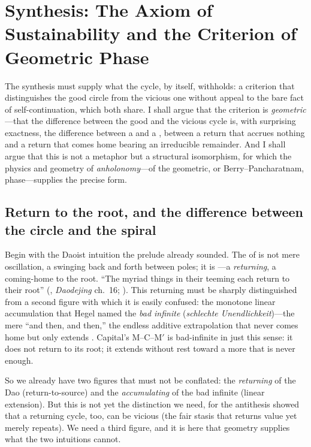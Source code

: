 \section{Synthesis: The Axiom of Sustainability and the Criterion of Geometric Phase}
\label{p09:sec:synthesis}

\noindent
The synthesis must supply what the cycle, by itself, withholds: a criterion that distinguishes the good circle from the vicious one without appeal to the bare fact of self-continuation, which both share. I shall argue that the criterion is \emph{geometric}---that the difference between the good and the vicious cycle is, with surprising exactness, the difference between a  and a , between a return that accrues nothing and a return that comes home bearing an irreducible remainder. And I shall argue that this is not a metaphor but a structural isomorphism, for which the physics and geometry of \emph{anholonomy}---of the geometric, or Berry--Pancharatnam, phase---supplies the precise form.

\subsection{Return to the root, and the difference between the circle and the spiral}
\label{p09:sec:returnroot}

Begin with the Daoist intuition the prelude already sounded. The  of  is not mere oscillation, a swinging back and forth between poles; it is ---a \emph{returning}, a coming-home to the root. ``The myriad things in their teeming each return to their root'' (, \emph{Daodejing} ch.~16; \cite{laozi1963}). This returning must be sharply distinguished from a second figure with which it is easily confused: the monotone linear accumulation that Hegel named the \emph{bad infinite} (\emph{schlechte Unendlichkeit})---the mere ``and then, and then,'' the endless additive extrapolation that never comes home but only extends \parencite{hegel2010}. Capital's M--C--M$'$ is bad-infinite in just this sense: it does not return to its root; it extends without rest toward a more that is never enough.

So we already have two figures that must not be conflated: the \emph{returning} of the Dao (return-to-source) and the \emph{accumulating} of the bad infinite (linear extension). But this is not yet the distinction we need, for the antithesis showed that a returning cycle, too, can be vicious (the fair stasis that returns value yet merely repeats). We need a third figure, and it is here that geometry supplies what the two intuitions cannot.

